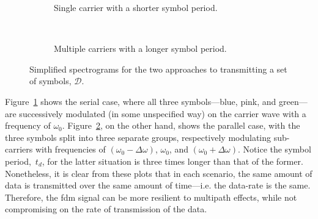 \documentclass[class=report,11pt,crop=false]{standalone}
\begin{document}
\begin{figure}[htbp]
    \centering
    \captionsetup{type=figure}
    \begin{subfigure}[t]{0.48\textwidth}
        \centering
        \def\svgwidth{0.9\linewidth}
        { %
            }
        \caption{Single carrier with a shorter symbol period.}
        \label{fig:serial-carrier}
    \end{subfigure}%
    ~ 
    \begin{subfigure}[t]{0.48\textwidth}
        \def\svgwidth{0.9\linewidth}
        { %
            }
        \caption{Multiple carriers with a longer symbol period.}
        \label{fig:parallel-carrier}
    \end{subfigure}
    \caption{Simplified spectrograms for the two approaches to transmitting a set of symbols, \(\mathcal{D}\).}
    \label{fig:carrier-illustration}
\end{figure}

Figure~\ref{fig:serial-carrier} shows the serial case, where all three symbols---blue, pink, and green---are successively modulated (in some unspecified way) on the carrier wave with a frequency of \(\omega_0\). Figure~\ref{fig:parallel-carrier}, on the other hand, shows the parallel case, with the three symbols split into three separate groups, respectively modulating sub-carriers with frequencies of \((\omega_0 - \Delta \omega)\), \(\omega_0\), and \((\omega_0 + \Delta \omega)\). Notice the symbol period,~\(t_d\), for the latter situation is three times longer than that of the former. Nonetheless, it is clear from these plots that in each scenario, the same amount of data is transmitted over the same amount of time---i.e. the data-rate is the same. Therefore, the \gls{fdm} signal can be more resilient to multipath effects, while not compromising on the rate of transmission of the data.
\end{document}
